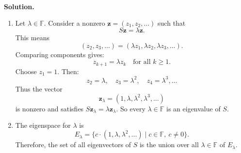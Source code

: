 \documentclass[11pt]{article}
\newcommand{\SolutionAnnounce}{\noindent\textbf{Solution.}\par\medskip}
\newcommand{\F}{\mathbb{F}}
\begin{document}
\begin{solutionBox}
\SolutionAnnounce
\doublespacing

\begin{enumerate}
    \item Let \(\lambda \in \F\). Consider a nonzero \(\mathbf{z} = (z_1, z_2, \dots)\) such that
    \[
    S\mathbf{z} = \lambda \mathbf{z}.
    \]
    This means
    \[
    (z_2, z_3, \dots) = (\lambda z_1, \lambda z_2, \lambda z_3, \dots).
    \]
    Comparing components gives: 
    \[
    z_{k+1} = \lambda z_k \quad \text{for all } k \ge 1.
    \]
    Choose \(z_1 = 1\). Then: 
    \[
    z_2 = \lambda, \quad z_3 = \lambda^2, \quad z_4 = \lambda^3, \dots
    \]
    Thus the vector
    \[
    \mathbf{z}_\lambda = (1, \lambda, \lambda^2, \lambda^3, \dots)
    \]
    is nonzero and satisfies \(S\mathbf{z}_\lambda = \lambda \mathbf{z}_\lambda\). So every \(\lambda \in \F\) is an eigenvalue of \(S\).

    \item The eigenspace for \(\lambda\) is
    \[
    E_\lambda = \{ c \cdot (1, \lambda, \lambda^2, \dots) \mid c \in \F,\ c \neq 0 \}.
    \]
    Therefore, the set of all eigenvectors of \(S\) is the union over all \(\lambda \in \F\) of \(E_\lambda\).
\end{enumerate}

\end{solutionBox}
\end{document}
